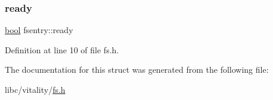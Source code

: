 \mbox{\label{a00272_a284522ed97fe1eeebd0fcc039b2ea00a_a284522ed97fe1eeebd0fcc039b2ea00a}} 
\subsubsection{\texorpdfstring{ready}{ready}}
{\footnotesize\ttfamily \hyperlink{a00140_af6a258d8f3ee5206d682d799316314b1_af6a258d8f3ee5206d682d799316314b1}{bool} fsentry\+::ready}



Definition at line 10 of file fs.\+h.



The documentation for this struct was generated from the following file\+:\begin{DoxyCompactItemize}
\item 
libc/vitality/\hyperlink{a00152}{fs.\+h}\end{DoxyCompactItemize}
